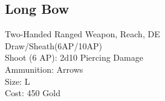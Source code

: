 \subsection{Long Bow}\label{weapon:longBow}
Two-Handed Ranged Weapon,  Reach, DE\\
Draw/Sheath(6AP/10AP)\\
Shoot (6 AP): 2d10 Piercing Damage\\
Ammunition: Arrows\\
Size: L\\
Cost: 450 Gold\\